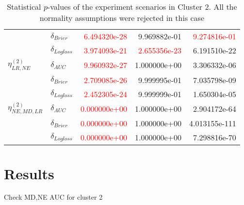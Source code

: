\begin{table}[!h]
\begin{tabular}{l|lrrr}
                             & $\delta_{Brier}$ &  \textcolor{red}{6.494320e-28} &  9.969882e-01 &   \textcolor{red}{9.274816e-01} \\
                             & $\delta_{Logloss}$ &  \textcolor{red}{3.974093e-21} &  \textcolor{red}{2.655356e-23} &   6.191510e-22 \\
                             \hline
        $\eta^{(2)}_{LR, NE}$ & $\delta_{AUC}$ &  \textcolor{red}{9.960932e-27} &  1.000000e+00 &   3.306332e-06 \\
                             & $\delta_{Brier}$ &  \textcolor{red}{2.709085e-26} &  9.999995e-01 &   7.035798e-09 \\
                             & $\delta_{Logloss}$ &  \textcolor{red}{2.452305e-24} &  9.999999e-01 &   1.650304e-05 \\
                             \hline
        $\eta^{(2)}_{NE, MD, LR}$ & $\delta_{AUC}$ &  \textcolor{red}{0.000000e+00} &  1.000000e+00 &   2.904172e-64 \\
                             & $\delta_{Brier}$ &  \textcolor{red}{0.000000e+00} &  1.000000e+00 &  4.013155e-111 \\
                             & $\delta_{Logloss}$ &  \textcolor{red}{0.000000e+00} &  1.000000e+00 &   7.298816e-70 \\
        \bottomrule
\end{tabular}        
\caption{Statistical $p$-values of the experiment scenarios in Cluster 2. All the normality assumptions were rejected in this case}
\label{table:result-cluster2}
\end{table}

\section{Results}

{\Huge Check MD,NE AUC for cluster 2}

